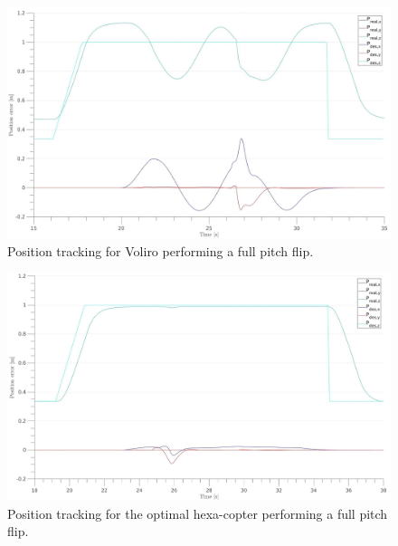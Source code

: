 \begin{figure}[!ht]
  \begin{center}
    \includegraphics[width=1.0\linewidth]{images/Voliro_pitch_position.jpg}
    \caption{Position tracking for Voliro performing a full pitch flip.}
    \label{fig:Voliro_position_pitch}
  \end{center}
\end{figure}

\begin{figure}[!ht]
  \begin{center}
    \includegraphics[width=1.0\linewidth]{images/Hexa_pitch_position.jpg}
    \caption{Position tracking for the optimal hexa-copter performing a full pitch flip.}
    \label{fig:Hexa_position_pitch}
  \end{center}
\end{figure}


